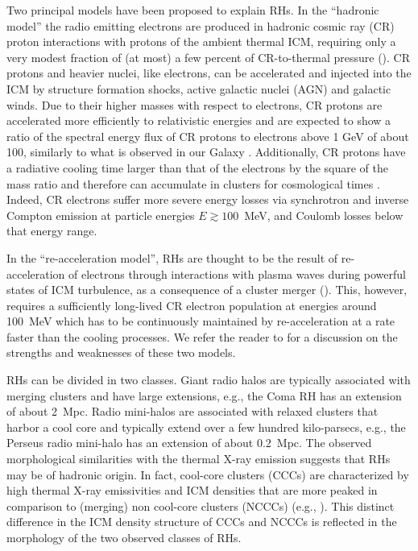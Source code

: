 \documentclass[useAMS,usenatbib]{mn2e}
\begin{document}
Two principal models have been proposed to explain RHs.  In the ``hadronic
model'' the radio emitting electrons are produced in hadronic cosmic ray (CR)
proton interactions with protons of the ambient thermal ICM, requiring only a
very modest fraction of (at most) a few percent of CR-to-thermal pressure
(\citealp{1980ApJ...239L..93D,1982AJ.....87.1266V, 1999APh....12..169B,
  2000A&A...362..151D, 2001ApJ...562..233M,2001ApJ...559...59M,
  2003MNRAS.342.1009M,2003A&A...407L..73P, 2004A&A...413...17P,
  2004MNRAS.352...76P, 2007IJMPA..22..681B, 2008MNRAS.385.1211P,
  2008MNRAS.385.1242P, 2009JCAP...09..024K, 2010MNRAS.401...47D,
  2010arXiv1003.0336D, 2010arXiv1003.1133K, 2010arXiv1011.0729K,
  2011A&A...527A..99E}).  CR protons and heavier nuclei, like electrons, can be
accelerated and injected into the ICM by structure formation shocks, active
galactic nuclei (AGN) and galactic winds.  Due to their higher masses with
respect to electrons, CR protons are accelerated more efficiently to
relativistic energies and are expected to show a ratio of the spectral energy
flux of CR protons to electrons above 1 GeV of about 100, similarly to what is
observed in our Galaxy \citep{2002cra..book.....S}. Additionally, CR protons
have a radiative cooling time larger than that of the electrons by the square of
the mass ratio and therefore can accumulate in clusters for cosmological times
\citep{1996SSRv...75..279V}. Indeed, CR electrons suffer more severe energy
losses via synchrotron and inverse Compton emission at particle energies $E
\gtrsim 100$~MeV, and Coulomb losses below that energy range.

In the ``re-acceleration model'', RHs are thought to be the result of
re-acceleration of electrons through interactions with plasma waves during
powerful states of ICM turbulence, as a consequence of a cluster merger
(\citealp{1987A&A...182...21S, 1993ApJ...406..399G, 2002A&A...386..456G,
  2004MNRAS.350.1174B, 2005MNRAS.363.1173B, 2007MNRAS.378..245B,
  2010arXiv1008.0184B, 2009A&A...507..661B, 2012arXiv1211.3337D}). This,
however, requires a sufficiently long-lived CR electron population at energies
around 100~MeV which has to be continuously maintained by re-acceleration at a
rate faster than the cooling processes.  We refer the reader to
\citet{2011A&A...527A..99E} for a discussion on the strengths and weaknesses of
these two models.

RHs can be divided in two classes. Giant radio halos are typically associated
with merging clusters and have large extensions, e.g., the Coma RH has
an extension of about 2~Mpc. Radio mini-halos are associated with relaxed
clusters that harbor a cool core and typically extend over a few hundred
kilo-parsecs, e.g., the Perseus radio mini-halo has an extension of about
0.2~Mpc.  The observed morphological similarities with the thermal X-ray
emission suggests that RHs may be of hadronic origin. In fact, cool-core
clusters (CCCs) are characterized by high thermal X-ray emissivities and ICM
densities that are more peaked in comparison to (merging) non cool-core clusters
(NCCCs) (e.g., \citealp{2008A&A...487..431C}). This distinct difference in the
ICM density structure of CCCs and NCCCs is reflected in the morphology of the
two observed classes of RHs.
\end{document}
